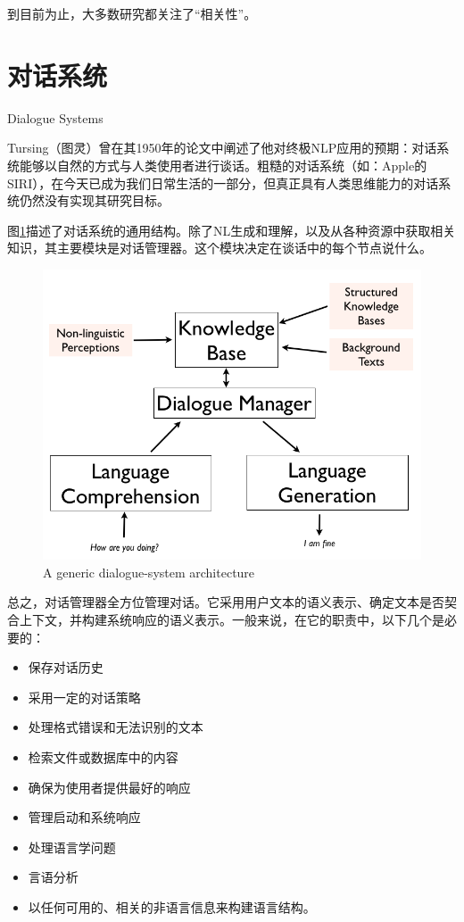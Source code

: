 到目前为止，大多数研究都关注了“相关性”。

\section{对话系统}{Dialogue Systems}

Tursing（图灵）曾在其1950年的论文中阐述了他对终极NLP应用的预期：对话系统能够以自然的方式与人类使用者进行谈话。粗糙的对话系统（如：Apple的SIRI），在今天已成为我们日常生活的一部分，但真正具有人类思维能力的对话系统仍然没有实现其研究目标。

图\ref{fig:dialogue}描述了对话系统的通用结构\cite{Arora2013}。除了NL生成和理解，以及从各种资源中获取相关知识，其主要模块是对话管理器。这个模块决定在谈话中的每个节点说什么。

\begin{figure}[htb]
\centering
\includegraphics[width=12cm]{figures/dialogue_system.png}
\caption{ A generic dialogue-system architecture }
\label{fig:dialogue}
\end{figure}

总之，对话管理器全方位管理对话。它采用用户文本的语义表示、确定文本是否契合上下文，并构建系统响应的语义表示。一般来说，在它的职责中，以下几个是必要的：

\begin{itemize}
\item 保存对话历史
\item 采用一定的对话策略
\item 处理格式错误和无法识别的文本
\item 检索文件或数据库中的内容
\item 确保为使用者提供最好的响应
\item 管理启动和系统响应
\item 处理语言学问题
\item 言语分析
\item 以任何可用的、相关的非语言信息来构建语言结构。
\end{itemize}

